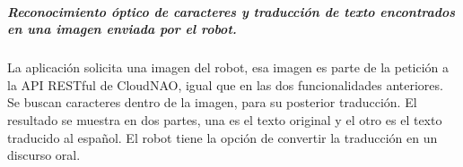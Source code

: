 \subparagraph{Reconocimiento óptico de caracteres y traducción de texto encontrados en una imagen enviada por el robot.}
\label{\detokenize{users_docs:reconocimiento-optico-de-caracteres-y-traduccion-de-texto-encontrados-en-una-imagen-enviada-por-el-robot}}
La aplicación solicita una imagen del robot, esa imagen es parte de la petición
a la API RESTful de CloudNAO, igual que en las dos funcionalidades anteriores.
Se buscan caracteres dentro de la imagen, para su posterior traducción.
El resultado se muestra en dos partes, una es el texto original y el otro
es el texto traducido al español. El robot tiene la opción de convertir la
traducción en un discurso oral.

\begin{figure}[!h]
    \centering
    \qquad

\end{figure}








